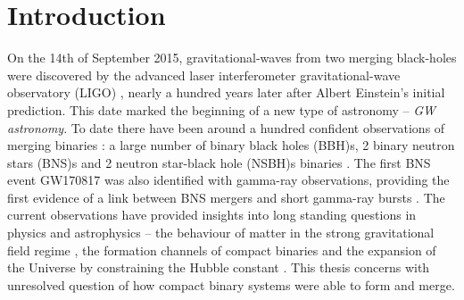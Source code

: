 \chapter{Introduction}


On the 14th of September 2015, gravitational-waves from two merging black-holes were discovered by the advanced laser interferometer gravitational-wave observatory (LIGO) \cite{LIGOScientific:2016aoc}, nearly a hundred years later after Albert Einstein's initial prediction. This date marked the beginning of a new type of astronomy -- \textit{GW astronomy}. To date there have been around a hundred confident observations of merging binaries \cite{Nitz:2021zwj,LIGOScientific:2021djp,Olsen:2022pin}: a large number of binary black holes (BBH)s, 2 binary neutron stars (BNS)s \cite{LIGOScientific:2017vwq, LIGOScientific:2020aai} and 2 neutron star-black hole (NSBH)s binaries \cite{LIGOScientific:2021qlt}. The first BNS event GW170817 was also identified with gamma-ray observations, providing the first evidence of a link between BNS mergers and short gamma-ray bursts \cite{LIGOScientific:2017vwq}. The current observations have provided insights into long standing questions in physics and astrophysics -- the behaviour of matter in the strong gravitational field regime \cite{LIGOScientific:2020tif,LIGOScientific:2018dkp,LIGOScientific:2016lio}, the formation channels of compact binaries \cite{KAGRA:2021duu,Mandel:2021smh} and the expansion of the Universe by constraining the Hubble constant \cite{Nissanke:2013fka, Palmese:2021mjm}. This thesis concerns with unresolved question of how compact binary systems were able to form and merge. 

